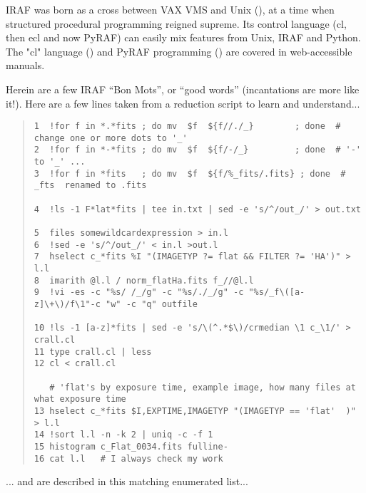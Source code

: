 IRAF was born as a cross between VAX VMS and Unix
(\cite{1984BAAS...16..497V}), at a time when structured procedural
programming reigned supreme. Its control language (cl, then ecl and
now PyRAF) can easily mix features from Unix, IRAF and Python.
The "cl" language (\cite{CLProgrammersGuide}) and PyRAF programming
(\cite{PyrafProgrammersGuide}) are covered in web-accessible manuals.

Herein are a few IRAF ``Bon Mots'', or ``good words'' (incantations
are more like it!). Here are a few lines taken from a reduction script
to learn and understand...

{\color{verbcolor}
\begin{quote}
\begingroup \fontsize{8pt}{8pt}
\selectfont
\begin{verbatim}
1  !for f in *.*fits ; do mv  $f  ${f//./_}        ; done  # change one or more dots to '_'
2  !for f in *-*fits ; do mv  $f  ${f/-/_}         ; done  # '-' to '_' ...
3  !for f in *fits   ; do mv  $f  ${f/%_fits/.fits} ; done  # _fts  renamed to .fits

4  !ls -1 F*lat*fits | tee in.txt | sed -e 's/^/out_/' > out.txt

5  files somewildcardexpression > in.l
6  !sed -e 's/^/out_/' < in.l >out.l
7  hselect c_*fits %I "(IMAGETYP ?= flat && FILTER ?= 'HA')" > l.l
8  imarith @l.l / norm_flatHa.fits f_//@l.l
9  !vi -es -c "%s/ /_/g" -c "%s/./_/g" -c "%s/_f\([a-z]\+\)/f\1"-c "w" -c "q" outfile

10 !ls -1 [a-z]*fits | sed -e 's/\(^.*$\)/crmedian \1 c_\1/' > crall.cl
11 type crall.cl | less
12 cl < crall.cl

   # 'flat's by exposure time, example image, how many files at what exposure time
13 hselect c_*fits $I,EXPTIME,IMAGETYP "(IMAGETYP == 'flat'  )" > l.l
14 !sort l.l -n -k 2 | uniq -c -f 1
15 histogram c_Flat_0034.fits fulline-
16 cat l.l   # I always check my work
\end{verbatim}
\endgroup
\end{quote}
}

... and are described in this matching enumerated list...


